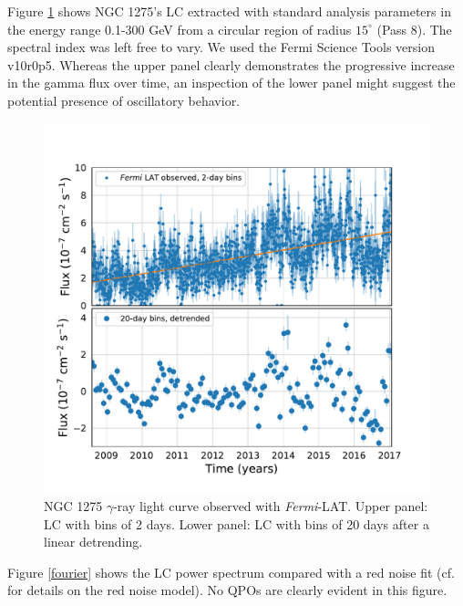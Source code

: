 \documentclass{iau}
\begin{document}
Figure \ref{lc} shows NGC 1275's LC extracted with standard analysis parameters in the energy range 0.1-300 GeV from a circular region of radius $15^{\circ}$ (Pass 8). The spectral index was left free to vary. We used the Fermi Science Tools version v10r0p5. Whereas the upper panel clearly demonstrates the progressive increase in the gamma flux over time, an inspection of the lower panel might suggest the potential presence of oscillatory behavior. 

\begin{figure}[h]
\begin{center}
\includegraphics[width=0.7\linewidth]{observations.pdf} 
\caption{NGC 1275 $\gamma$-ray light curve observed with \textit{Fermi}-LAT. Upper panel: LC with bins of 2 days. Lower panel: LC with bins of 20 days after a linear detrending.}
\label{lc}
\end{center}
\end{figure}

Figure \ref{fourier} shows the LC power spectrum compared with a red noise fit (cf. \cite[Torrence \& Compo 1998]{Torrence1998} for details on the red noise model). 
No QPOs are clearly evident in this figure.
\end{document}
